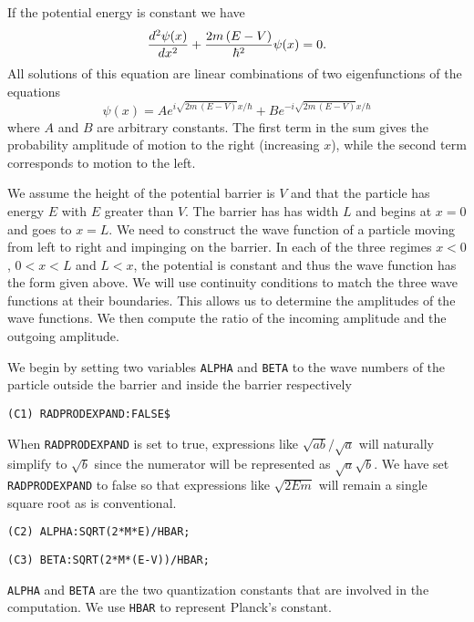 If the potential energy is constant we have
\[
{d^2 \psi(x) \over dx^2} + {2 m\,(E - V) \over \hbar^2} \psi(x) = 0.
\]
All solutions of this equation are linear combinations of two eigenfunctions
of the equations
\[
\psi(x) =  A e^{i \sqrt{2m\,(E - V)} x/ \hbar} + B e^{- i \sqrt{2m\,(E
- V)} x/ \hbar} 
\]
where $A$ and $B$ are arbitrary constants.  The first term in the sum gives
the probability amplitude of motion to the right (increasing $x$), while the
second term corresponds to motion to the left.  

We assume the height of the potential barrier is $V$ and that the
particle has energy $E$ with $E$ greater than $V$.
The barrier has has width $L$ and begins at $x=0$ and goes to
$x=L$.  We need to construct the wave function of a particle moving from
left to right and impinging on the barrier.  In each of the three regimes
$x<0$, $0<x<L$ and $L<x$, the potential is constant and thus the wave
function has the form given above.  We will use continuity conditions to
match the three wave functions at their boundaries.  This allows us to
determine the amplitudes of the wave functions.  We then compute the ratio
of the incoming amplitude and the outgoing amplitude.

We begin by setting two variables {\tt ALPHA} and {\tt BETA} to the wave
numbers of the particle outside the barrier and inside the barrier respectively
\begin{verbatim}
(C1) RADPRODEXPAND:FALSE$
\end{verbatim}
When {\tt RADPRODEXPAND} is set to true, expressions like $\sqrt{a b} /
\sqrt{a}$ will naturally simplify to $\sqrt{b}$ since the numerator will be
represented as $\sqrt{a} \sqrt{b}$.  We have set {\tt RADPRODEXPAND} to
false so that expressions like $\sqrt{2Em}$ will remain a single square
root as is conventional.
\begin{verbatim}
(C2) ALPHA:SQRT(2*M*E)/HBAR;
\end{verbatim}
\begin{verbatim}
(C3) BETA:SQRT(2*M*(E-V))/HBAR;
\end{verbatim}
{\tt ALPHA} and {\tt BETA} are the two quantization constants that are
involved in the computation.  We use {\tt HBAR} to represent Planck's
constant.

